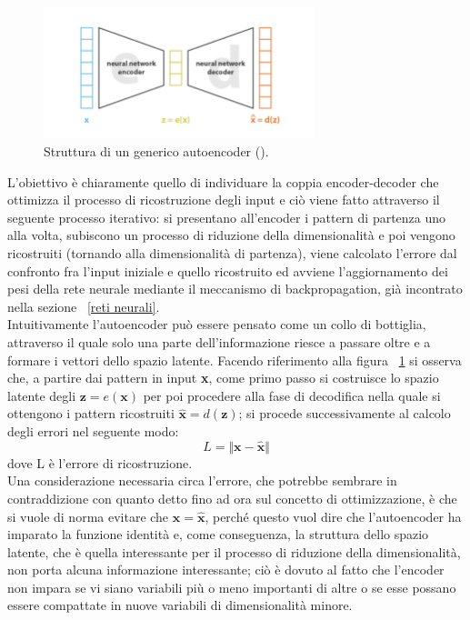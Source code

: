 \begin{figure}[h!]
	\centering
	\includegraphics[width=0.70\textwidth]{figs/autoencoder.png}
	\caption{Struttura di un generico autoencoder (\cite{Understanding_VAEs}).}
	\label{autoencoder}
\end{figure}

L'obiettivo è chiaramente quello di individuare la coppia encoder-decoder che ottimizza il processo di ricostruzione degli input e ciò viene fatto attraverso il seguente processo iterativo: si presentano all'encoder i pattern di partenza uno alla volta, subiscono un processo di riduzione della dimensionalità e poi vengono ricostruiti (tornando alla dimensionalità di partenza), viene calcolato l'errore dal confronto fra l'input iniziale e quello ricostruito ed avviene l'aggiornamento dei pesi della rete neurale mediante il meccanismo di backpropagation, già incontrato nella sezione ~\ref{reti neurali}. \\
Intuitivamente l'autoencoder può essere pensato come un collo di bottiglia, attraverso il quale solo una parte dell'informazione riesce a passare oltre e a formare i vettori dello spazio latente.
Facendo riferimento alla figura ~\ref{autoencoder} si osserva che, a partire dai pattern in input \textbf{x}, come primo passo si costruisce lo spazio latente degli $\textbf{z} = e(\textbf{x})$ per poi procedere alla fase di decodifica nella quale si ottengono i pattern ricostruiti $\hat{\textbf{x}} = d(\textbf{z})$; si procede successivamente al calcolo degli errori nel seguente modo:
\begin{equation}
	L = \Vert \textbf{x} - \hat{\textbf{x}} \Vert
\end{equation}
dove L è l'errore di ricostruzione.\\
Una considerazione necessaria circa l'errore, che potrebbe sembrare in contraddizione con quanto detto fino ad ora sul concetto di ottimizzazione, è che si vuole di norma evitare che $\textbf{x} = \hat{\textbf{x}}$, perché questo vuol dire che l'autoencoder ha imparato la funzione identità e, come conseguenza, la struttura dello spazio latente, che è quella interessante per il processo di riduzione della dimensionalità, non porta alcuna informazione interessante; ciò è dovuto al fatto che l'encoder non impara se vi siano variabili più o meno importanti di altre o se esse possano essere compattate in nuove variabili di dimensionalità minore. \\
